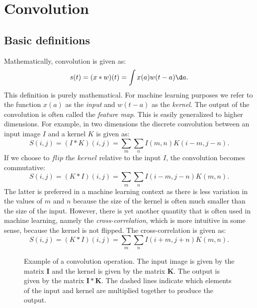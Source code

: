 %
%

\section{Convolution}
    \subsection{Basic definitions}
        Mathematically, convolution is given as:
        \begin{equation}\label{eq:ML:CNN:convolution:basic_defintion}
            s(t) = (x * w)(t) = \int x(a)w(t-a)\d a.
        \end{equation}
        This definition is purely mathematical. For machine learning purposes we refer to the function $x(a)$ as the \textit{input} and $w(t-a)$ as the \textit{kernel}. The output of the convolution is often called the \textit{feature map}. This is easily generalized to higher dimensions. For example, in two dimensions the discrete convolution between an input image $I$ and a kernel $K$ is given as:
        \begin{equation}\label{eq:ML:CNN:convolution:discrete_convolution}
            S(i,j) = (I * K)(i,j) = \sum_m\sum_n I(m,n)K(i-m,j-n).
        \end{equation}
        If we choose to $\textit{flip the kernel}$ relative to the input $I$, the convolution becomes commutative:
        \begin{equation}\label{eq:ML:CNN:convolution:discrete_convolution_commutative}
            S(i,j) = (K * I)(i,j) = \sum_m\sum_n I(i-m,j-n)K(m,n).
        \end{equation}
        The latter is preferred in a machine learning context as there is less variation in the values of $m$ and $n$ because the size of the kernel is often much smaller than the size of the input. However, there is yet another quantity that is often used in machine learning, namely the \textit{cross-correlation}, which is more intuitive in some sense, because the kernel is not flipped. The cross-correlation is given as:
        \begin{equation}\label{eq:ML:CNN:convolution:cross_correlation}
            S(i,j) = (K * I)(i,j) = \sum_m\sum_n I(i+m,j+n)K(m,n).
        \end{equation}

        \begin{figure}[h!]
            \centering
            
            \caption{Example of a convolution operation. The input image is given by the matrix $\mathbf I$ and the kernel is given by the matrix $\mathbf K$. The output is given by the matrix $\mathbf{I * K}$. The dashed lines indicate which elements of the input and kernel are multiplied together to produce the output.}
            \label{fig:ML:CNN:convolution:convolution_operation_map_example}
        \end{figure}
